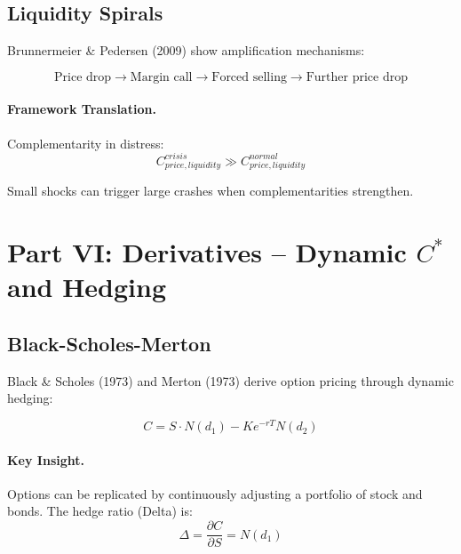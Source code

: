 \subsection{Liquidity Spirals}

Brunnermeier \& Pedersen (2009) show amplification mechanisms:

\begin{equation}
\text{Price drop} \to \text{Margin call} \to \text{Forced selling} \to \text{Further price drop}
\end{equation}

\paragraph{Framework Translation.}
Complementarity in distress:
\begin{equation}
C_{price, liquidity}^{crisis} \gg C_{price, liquidity}^{normal}
\end{equation}

Small shocks can trigger large crashes when complementarities strengthen.


\section{Part VI: Derivatives -- Dynamic $C^*$ and Hedging}
\label{sec:Y-derivatives}

\subsection{Black-Scholes-Merton}

Black \& Scholes (1973) and Merton (1973) derive option pricing through
dynamic hedging:

\begin{equation}
\boxed{
C = S \cdot N(d_1) - K e^{-rT} N(d_2)
}
\label{eq:bsm}
\end{equation}

\paragraph{Key Insight.}
Options can be replicated by continuously adjusting a portfolio of stock and
bonds. The hedge ratio (Delta) is:
\begin{equation}
\Delta = \frac{\partial C}{\partial S} = N(d_1)
\end{equation}

